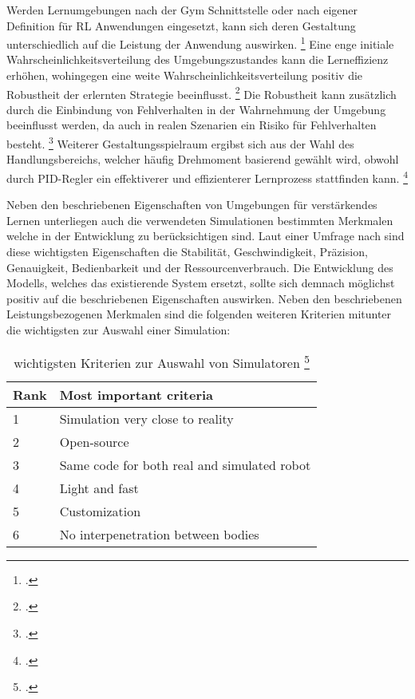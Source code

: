 Werden Lernumgebungen nach der Gym Schnittstelle oder nach eigener Definition für RL Anwendungen eingesetzt, kann sich deren Gestaltung unterschiedlich auf die Leistung der Anwendung auswirken. \footcite[Vgl.][S. 1]{Reda.2020}
Eine enge initiale Wahrscheinlichkeitsverteilung des Umgebungszustandes kann die Lerneffizienz erhöhen, wohingegen eine weite Wahrscheinlichkeitsverteilung positiv die Robustheit der erlernten Strategie beeinflusst. \footcite[Vgl.][S. 3]{Reda.2020}
Die Robustheit kann zusätzlich durch die Einbindung von Fehlverhalten in der Wahrnehmung der Umgebung beeinflusst werden, da auch in realen Szenarien ein Risiko für Fehlverhalten besteht. \footcite[Vgl.][S. 2]{YanDuan.2016} 
Weiterer Gestaltungsspielraum ergibst sich aus der Wahl des Handlungsbereichs, welcher häufig Drehmoment basierend gewählt wird, obwohl durch PID-Regler ein effektiverer und effizienterer Lernprozess stattfinden kann. \footcite[Vgl.][S. 7]{Reda.2020}

Neben den beschriebenen Eigenschaften von Umgebungen für verstärkendes Lernen unterliegen auch die verwendeten Simulationen bestimmten Merkmalen welche in der Entwicklung zu berücksichtigen sind.
Laut einer Umfrage nach \cite[]{Ivaldi.2272014} sind diese wichtigsten Eigenschaften die Stabilität, Geschwindigkeit, Präzision, Genauigkeit, Bedienbarkeit und der Ressourcenverbrauch.
Die Entwicklung des Modells, welches das existierende System ersetzt, sollte sich demnach möglichst positiv auf die beschriebenen Eigenschaften auswirken.
Neben den beschriebenen Leistungsbezogenen Merkmalen sind die folgenden weiteren Kriterien mitunter die wichtigsten zur Auswahl einer Simulation:

\begin{table}[H]
    \centering
    \begin{tabular}{|l|l|}
    \hline
    Rank & Most important criteria                     \\ \hline
    1    & Simulation very close to reality            \\
    2    & Open-source                                 \\
    3    & Same code for both real and simulated robot \\
    4    & Light and fast                              \\
    5    & Customization                               \\
    6    & No interpenetration between bodies          \\ \hline
    \end{tabular}
    \caption{wichtigsten Kriterien zur Auswahl von Simulatoren \footcite[][S. 4]{Ivaldi.2272014}}
    \label{tab:important-criteria}
\end{table}

